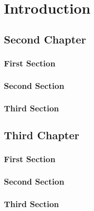 \documentclass{iasthesis}
\begin{document}
	\part{Introduction}
	\kant
	
	\chapter{Second Chapter}
	\kant
	\section{First Section}
	\kant
	\section{Second Section}
	\kant
	\section{Third Section}
	\kant
	
	\chapter{Third Chapter}
	\kant
	\section{First Section}
	\kant
	\section{Second Section}
	\kant
	\section{Third Section}
	\kant
		
\end{document}
